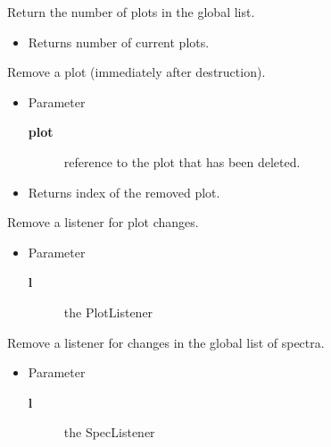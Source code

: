 \begin{desc}Return the number of plots in the global list.
\begin{itemize}
\item{Returns number of current plots. }
\end{itemize}
\end{desc}

\begin{desc}Remove a plot (immediately after destruction).
\begin{itemize}
\item{Parameter
  \begin{description}
   \item[\textbf{plot}]{reference to the plot that has been deleted.}
  \end{description}}
\end{itemize}
\begin{itemize}
\item{Returns index of the removed plot. }
\end{itemize}
\end{desc}

\begin{desc}Remove a listener for plot changes.
\begin{itemize}
\item{Parameter
  \begin{description}
   \item[\textbf{l}]{the PlotListener}
  \end{description}}
\end{itemize}
\end{desc}

\begin{desc}Remove a listener for changes in the global list of spectra.
\begin{itemize}
\item{Parameter
  \begin{description}
   \item[\textbf{l}]{the SpecListener}
  \end{description}}
\end{itemize}
\end{desc}


